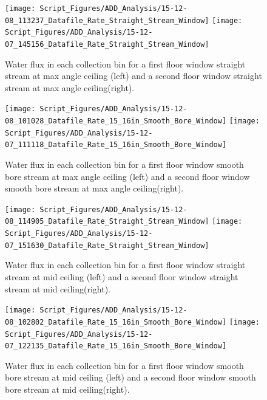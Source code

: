 \documentclass[12pt,oneside]{book}
\begin{document}
\begin{figure}[ht]
\texttt{[image: Script\_Figures/ADD\_Analysis/15-12-08\_113237\_Datafile\_Rate\_Straight\_Stream\_Window]}
\texttt{[image: Script\_Figures/ADD\_Analysis/15-12-07\_145156\_Datafile\_Rate\_Straight\_Stream\_Window]} \\ 
\caption[Water Flux for Straight Stream Max Angle Varying Window Floor]{Water flux in each collection bin for a first floor window straight stream at max angle ceiling (left) and a second floor window straight stream at max angle ceiling(right).}
\label{fig:Window_First_Floor_Second_Floor_SS_Max}
\end{figure}

\begin{figure}[ht]
\texttt{[image: Script\_Figures/ADD\_Analysis/15-12-08\_101028\_Datafile\_Rate\_15\_16in\_Smooth\_Bore\_Window]}
\texttt{[image: Script\_Figures/ADD\_Analysis/15-12-07\_111118\_Datafile\_Rate\_15\_16in\_Smooth\_Bore\_Window]} \\ 
\caption[Water Flux for Smooth Bore Max Angle Varying Window Floor]{Water flux in each collection bin for a first floor window smooth bore stream at max angle ceiling (left) and a second floor window smooth bore stream at max angle ceiling(right).}
\label{fig:Window_First_Floor_Second_Floor_SB_Max}
\end{figure}

\begin{figure}[ht]
\texttt{[image: Script\_Figures/ADD\_Analysis/15-12-08\_114905\_Datafile\_Rate\_Straight\_Stream\_Window]}
\texttt{[image: Script\_Figures/ADD\_Analysis/15-12-07\_151630\_Datafile\_Rate\_Straight\_Stream\_Window]} \\ 
\caption[Water Flux for Straight Stream Mid Ceiling Varying Window Floor]{Water flux in each collection bin for a first floor window straight stream at mid ceiling (left) and a second floor window straight stream at mid ceiling(right).}
\label{fig:Window_First_Floor_Second_Floor_SS_Mid}
\end{figure}

\begin{figure}[ht]
\texttt{[image: Script\_Figures/ADD\_Analysis/15-12-08\_102802\_Datafile\_Rate\_15\_16in\_Smooth\_Bore\_Window]}
\texttt{[image: Script\_Figures/ADD\_Analysis/15-12-07\_122135\_Datafile\_Rate\_15\_16in\_Smooth\_Bore\_Window]} \\ 
\caption[Water Flux for Smooth Bore Mid Ceiling Varying Window Floor]{Water flux in each collection bin for a first floor window smooth bore stream at mid ceiling (left) and a second floor window smooth bore stream at mid ceiling(right).}
\label{fig:Window_First_Floor_Second_Floor_SB_Mid}
\end{figure}
\end{document}
